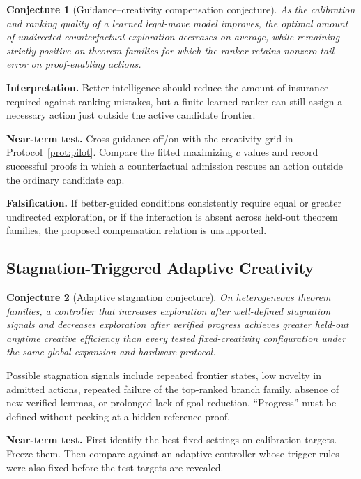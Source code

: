 \documentclass[11pt]{article}
\theoremstyle{datatheorem}
\newtheorem{conjecture}{Conjecture}[section]
\theoremstyle{definition}
\begin{document}
\begin{conjecture}[Guidance--creativity compensation conjecture]\label{conj:guidance}
As the calibration and ranking quality of a learned legal-move model improves, the optimal amount of undirected counterfactual exploration decreases on average, while remaining strictly positive on theorem families for which the ranker retains nonzero tail error on proof-enabling actions.
\end{conjecture}

\textbf{Interpretation.} Better intelligence should reduce the amount of insurance required against ranking mistakes, but a finite learned ranker can still assign a necessary action just outside the active candidate frontier.

\textbf{Near-term test.} Cross guidance off/on with the creativity grid in Protocol~\ref{prot:pilot}. Compare the fitted maximizing $c$ values and record successful proofs in which a counterfactual admission rescues an action outside the ordinary candidate cap.

\textbf{Falsification.} If better-guided conditions consistently require equal or greater undirected exploration, or if the interaction is absent across held-out theorem families, the proposed compensation relation is unsupported.

\clearpage
\subsection{Stagnation-Triggered Adaptive Creativity}

\begin{conjecture}[Adaptive stagnation conjecture]\label{conj:adaptive}
On heterogeneous theorem families, a controller that increases exploration after well-defined stagnation signals and decreases exploration after verified progress achieves greater held-out anytime creative efficiency than every tested fixed-creativity configuration under the same global expansion and hardware protocol.
\end{conjecture}

Possible stagnation signals include repeated frontier states, low novelty in admitted actions, repeated failure of the top-ranked branch family, absence of new verified lemmas, or prolonged lack of goal reduction. ``Progress'' must be defined without peeking at a hidden reference proof.

\textbf{Near-term test.} First identify the best fixed settings on calibration targets. Freeze them. Then compare against an adaptive controller whose trigger rules were also fixed before the test targets are revealed.
\end{document}
